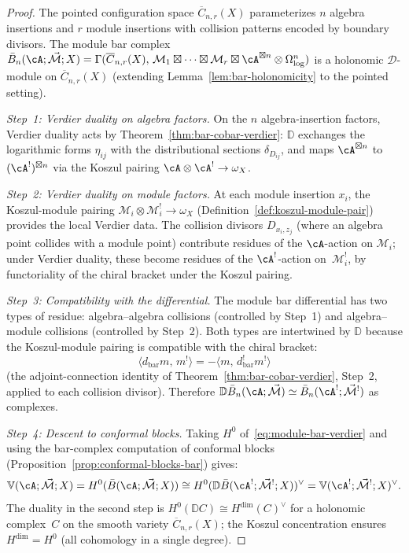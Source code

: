 \begin{proof}
The pointed configuration space $\overline{C}_{n,r}(X)$
parameterizes $n$ algebra insertions and $r$ module insertions
with collision patterns encoded by boundary divisors.  The module
bar complex
$\bar{B}_n(\cA; \vec{\mathcal{M}}; X)
= \Gamma(\overline{C}_{n,r}(X),\,
\mathcal{M}_1 \boxtimes \cdots \boxtimes \mathcal{M}_r
\boxtimes \cA^{\boxtimes n} \otimes \Omega^n_{\log})$
is a holonomic $\mathcal{D}$-module on $\overline{C}_{n,r}(X)$
(extending Lemma~\ref{lem:bar-holonomicity} to the pointed
setting).

\emph{Step~1: Verdier duality on algebra factors.}
On the $n$ algebra-insertion factors, Verdier duality acts by
Theorem~\ref{thm:bar-cobar-verdier}: $\mathbb{D}$ exchanges the
logarithmic forms $\eta_{ij}$ with the distributional sections
$\delta_{D_{ij}}$, and maps $\cA^{\boxtimes n}$ to
$(\cA^!)^{\boxtimes n}$ via the Koszul pairing
$\cA \otimes \cA^! \to \omega_X$.

\emph{Step~2: Verdier duality on module factors.}
At each module insertion $x_i$, the Koszul-module pairing
$\mathcal{M}_i \otimes \mathcal{M}_i^! \to \omega_X$
(Definition~\ref{def:koszul-module-pair}) provides the local
Verdier data.  The collision divisors $D_{x_i, z_j}$ (where an
algebra point collides with a module point) contribute residues of
the $\cA$-action on $\mathcal{M}_i$; under Verdier duality, these
become residues of the $\cA^!$-action on~$\mathcal{M}_i^!$, by
functoriality of the chiral bracket under the Koszul pairing.

\emph{Step~3: Compatibility with the differential.}
The module bar differential has two types of residue:
algebra--algebra collisions (controlled by Step~1) and
algebra--module collisions (controlled by Step~2).  Both types
are intertwined by $\mathbb{D}$ because the Koszul-module
pairing is compatible with the chiral bracket:
\[
\langle d_{\mathrm{bar}} m,\, m^! \rangle
= - \langle m,\, d_{\mathrm{bar}}^! m^! \rangle
\]
(the adjoint-connection identity of
Theorem~\ref{thm:bar-cobar-verdier}, Step~2, applied to each
collision divisor).  Therefore
$\mathbb{D}\bar{B}_n(\cA; \vec{\mathcal{M}})
\simeq \bar{B}_n(\cA^!; \vec{\mathcal{M}}^!)$ as complexes.

\emph{Step~4: Descent to conformal blocks.}
Taking $H^0$ of~\eqref{eq:module-bar-verdier} and using the
bar-complex computation of conformal blocks
(Proposition~\ref{prop:conformal-blocks-bar}) gives:
\[
\mathbb{V}(\cA; \vec{\mathcal{M}}; X)
= H^0(\bar{B}(\cA; \vec{\mathcal{M}}; X))
\cong H^0(\mathbb{D}\bar{B}(\cA^!; \vec{\mathcal{M}}^!; X))^\vee
= \mathbb{V}(\cA^!; \vec{\mathcal{M}}^!; X)^\vee.
\]
The duality in the second step is
$H^0(\mathbb{D} C) \cong H^{\dim}(C)^\vee$ for a holonomic
complex~$C$ on the smooth variety $\overline{C}_{n,r}(X)$;
the Koszul concentration ensures $H^{\dim} = H^0$ (all
cohomology in a single degree).
\end{proof}

